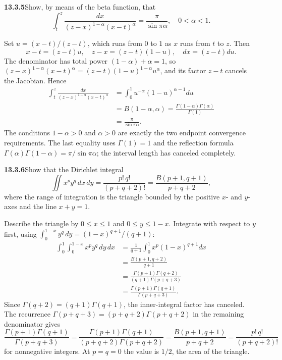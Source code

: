 \par\bigskip
\noindent\textbf{13.3.5}\quad Show, by means of the beta function, that
\[
\int_{t}^{z}\frac{dx}{(z-x)^{1-\alpha}(x-t)^{\alpha}}
=\frac{\pi}{\sin\pi\alpha},\quad 0<\alpha<1.
\]
\par\smallskip
{}
\solution
{}
Set $u=(x-t)/(z-t)$, which runs from $0$ to $1$ as $x$ runs from
$t$ to $z$.  Then
\[
x-t=(z-t)u,\quad z-x=(z-t)(1-u),\quad dx=(z-t)du.
\]
The denominator has total power $(1-\alpha)+\alpha=1$, so
$(z-x)^{1-\alpha}(x-t)^\alpha=(z-t)(1-u)^{1-\alpha}u^\alpha$, and
its factor $z-t$ cancels the Jacobian.  Hence
\begin{align*}
\int_t^z\frac{dx}{(z-x)^{1-\alpha}(x-t)^\alpha}
&=\int_0^1u^{-\alpha}(1-u)^{\alpha-1}du\\
&=B(1-\alpha,\alpha)
=\frac{\Gamma(1-\alpha)\Gamma(\alpha)}{\Gamma(1)}\\
&=\boxed{\frac\pi{\sin\pi\alpha}}.
\end{align*}
The conditions $1-\alpha>0$ and $\alpha>0$ are exactly the
two endpoint convergence requirements.  The last equality uses
$\Gamma(1)=1$ and the reflection formula
$\Gamma(\alpha)\Gamma(1-\alpha)=\pi/\sin\pi\alpha$; the interval
length has canceled completely.


\par\bigskip
\noindent\textbf{13.3.6}\quad Show that the Dirichlet integral
\[
\iint x^{p}y^{q}\,dx\,dy=\frac{p!\,q!}{(p+q+2)!}=\frac{B(p+1,q+1)}{p+q+2},
\]
where the range of integration is the triangle bounded by the positive $x$-
and $y$-axes and the line $x+y=1$.
\par\smallskip
{}
\solution
{}
Describe the triangle by $0\le x\le1$ and $0\le y\le1-x$.
Integrate with respect to $y$ first, using
$\int_0^{1-x}y^q\,dy=(1-x)^{q+1}/(q+1)$:
\begin{align*}
\int_0^1\int_0^{1-x}x^py^q\,dy\,dx
&=\frac1{q+1}\int_0^1x^p(1-x)^{q+1}dx\\
&=\frac{B(p+1,q+2)}{q+1}\\
&=\frac{\Gamma(p+1)\Gamma(q+2)}{(q+1)\Gamma(p+q+3)}\\
&=\boxed{\frac{\Gamma(p+1)\Gamma(q+1)}{\Gamma(p+q+3)}}.
\end{align*}
Since $\Gamma(q+2)=(q+1)\Gamma(q+1)$, the inner-integral
factor has canceled.  The recurrence
$\Gamma(p+q+3)=(p+q+2)\Gamma(p+q+2)$ in the remaining denominator
gives
\[
\frac{\Gamma(p+1)\Gamma(q+1)}{\Gamma(p+q+3)}
=\frac{\Gamma(p+1)\Gamma(q+1)}{(p+q+2)\Gamma(p+q+2)}
=\boxed{\frac{B(p+1,q+1)}{p+q+2}}
=\frac{p!\,q!}{(p+q+2)!}
\]
for nonnegative integers.  At $p=q=0$ the value is $1/2$, the
area of the triangle.


